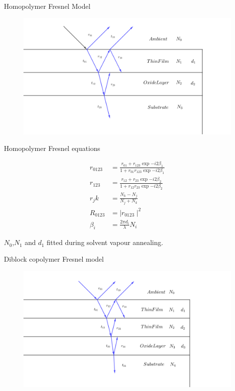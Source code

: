 \documentclass[10pt]{beamer}
\begin{document}
\begin{frame}{Homopolymer Fresnel Model}
	\begin{figure}
	\centering
	\includegraphics[width=\textwidth]{figmulti1.png}
	\end{figure}
\end{frame}
\begin{frame}{Homopolymer Fresnel equations}


\begin{align*}
r_{0123} &= \frac{r_{01}+r_{123}\exp{-i2\beta_1}}{1+r_{01}r_{123}\exp{-i2\beta_1}}\\
r_{123} &= \frac{r_{12}+r_{23}\exp{-i2\beta_2}}{1+r_{12}r_{23}\exp{-i2\beta_2}}\\
r_jk &= \frac{N_k-N_j}{N_j+N_k}\\
R_{0123} &= \mid r_{0123} \mid ^2 \\
\beta_i &= \frac{2\pi d_i}{\lambda}N_i
\end{align*}

$N_0$,$N_1$ and $d_1$ fitted during solvent vapour annealing.

\end{frame}

\begin{frame}{Diblock copolymer Fresnel model}
	\begin{figure}
	\centering
	\includegraphics[width=\textwidth]{diblock.png}
\end{figure}
\end{frame}
\end{document}
